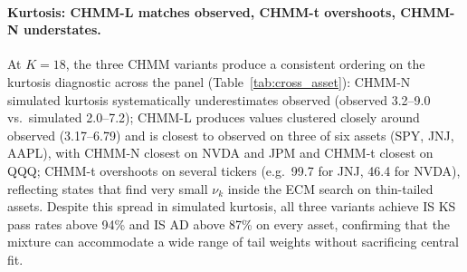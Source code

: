 \paragraph{Kurtosis: CHMM-L matches observed, CHMM-t overshoots, CHMM-N understates.}
At $K = 18$, the three CHMM variants produce a consistent ordering on the kurtosis diagnostic across the panel (Table~\ref{tab:cross_asset}): CHMM-N simulated kurtosis systematically underestimates observed (observed 3.2--9.0 vs.\ simulated 2.0--7.2); CHMM-L produces values clustered closely around observed (3.17--6.79) and is closest to observed on three of six assets (SPY, JNJ, AAPL), with CHMM-N closest on NVDA and JPM and CHMM-t closest on QQQ; CHMM-t overshoots on several tickers (e.g.\ 99.7 for JNJ, 46.4 for NVDA), reflecting states that find very small $\nu_k$ inside the ECM search on thin-tailed assets.
Despite this spread in simulated kurtosis, all three variants achieve IS KS pass rates above 94\% and IS AD above 87\% on every asset, confirming that the mixture can accommodate a wide range of tail weights without sacrificing central fit.


